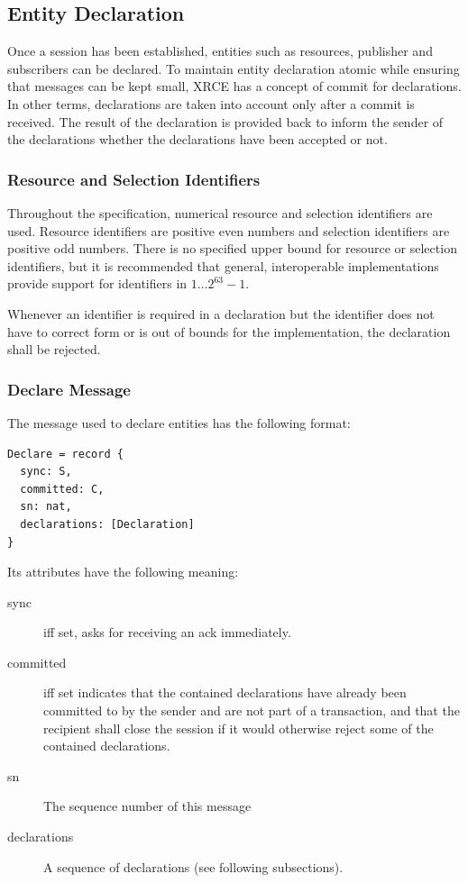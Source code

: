 \documentclass[a4paper,oneside,article]{memoir}
\begin{document}
\subsection{Entity Declaration}

Once a session has been established, entities such as resources, publisher and subscribers can be
declared.  To maintain entity declaration atomic while ensuring that messages can be kept small,
XRCE has a concept of commit for declarations.  In other terms, declarations are taken into account
only after a commit is received.  The result of the declaration is provided back to inform the
sender of the declarations whether the declarations have been accepted or not.

\subsubsection{Resource and Selection Identifiers}

Throughout the specification, numerical resource and selection identifiers are used.  Resource
identifiers are positive even numbers and selection identifiers are positive odd numbers.  There is
no specified upper bound for resource or selection identifiers, but it is recommended that general,
interoperable implementations provide support for identifiers in $1 \ldots{} 2^{63}-1$.

Whenever an identifier is required in a declaration but the identifier does not have to correct form
or is out of bounds for the implementation, the declaration shall be rejected.

\subsubsection{Declare Message}

The message used to declare entities has the following format:
\begin{verbatim}
Declare = record {
  sync: S,
  committed: C,
  sn: nat,
  declarations: [Declaration]
}
\end{verbatim}
Its attributes have the following meaning:
\begin{description}
\item[sync] iff set, asks for receiving an ack immediately. 
\item[committed] iff set indicates that the contained declarations have already been committed to by
  the sender and are not part of a transaction, and that the recipient shall close the session if it
  would otherwise reject some of the contained declarations.
\item[sn] The sequence number of this message
\item[declarations] A sequence of declarations (see following subsections).
\end{description}
\end{document}

